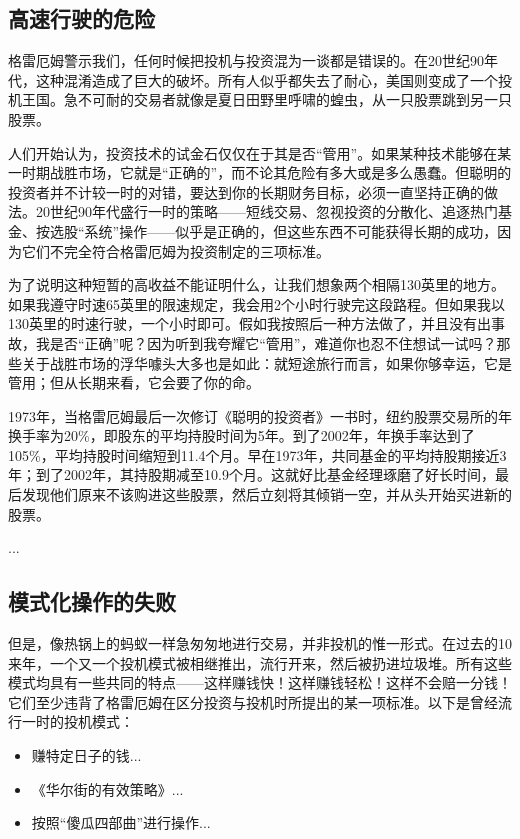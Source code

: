 \documentclass[12pt,oneside]{book}
\begin{document}
\subsection{高速行驶的危险}
格雷厄姆警示我们，任何时候把投机与投资混为一谈都是错误的。在20世纪90年代，这种混淆造成了巨大的破坏。所有人似乎都失去了耐心，美国则变成了一个投机王国。急不可耐的交易者就像是夏日田野里呼啸的蝗虫，从一只股票跳到另一只股票。

人们开始认为，投资技术的试金石仅仅在于其是否“管用”。如果某种技术能够在某一时期战胜市场，它就是“正确的”，而不论其危险有多大或是多么愚蠢。但聪明的投资者并不计较一时的对错，要达到你的长期财务目标，必须一直坚持正确的做法。20世纪90年代盛行一时的策略——短线交易、忽视投资的分散化、追逐热门基金、按选股“系统”操作——似乎是正确的，但这些东西不可能获得长期的成功，因为它们不完全符合格雷厄姆为投资制定的三项标准。

为了说明这种短暂的高收益不能证明什么，让我们想象两个相隔130英里的地方。如果我遵守时速65英里的限速规定，我会用2个小时行驶完这段路程。但如果我以130英里的时速行驶，一个小时即可。假如我按照后一种方法做了，并且没有出事故，我是否“正确”呢？因为听到我夸耀它“管用”，难道你也忍不住想试一试吗？那些关于战胜市场的浮华噱头大多也是如此：就短途旅行而言，如果你够幸运，它是管用；但从长期来看，它会要了你的命。

1973年，当格雷厄姆最后一次修订《聪明的投资者》一书时，纽约股票交易所的年换手率为20\%，即股东的平均持股时间为5年。到了2002年，年换手率达到了105\%，平均持股时间缩短到11.4个月。早在1973年，共同基金的平均持股期接近3年；到了2002年，其持股期减至10.9个月。这就好比基金经理琢磨了好长时间，最后发现他们原来不该购进这些股票，然后立刻将其倾销一空，并从头开始买进新的股票。

...



\subsection{模式化操作的失败}
但是，像热锅上的蚂蚁一样急匆匆地进行交易，并非投机的惟一形式。在过去的10来年，一个又一个投机模式被相继推出，流行开来，然后被扔进垃圾堆。所有这些模式均具有一些共同的特点——这样赚钱快！这样赚钱轻松！这样不会赔一分钱！它们至少违背了格雷厄姆在区分投资与投机时所提出的某一项标准。以下是曾经流行一时的投机模式：

\begin{itemize}
\item 赚特定日子的钱...

\item 《华尔街的有效策略》...

\item 按照“傻瓜四部曲”进行操作...

\end{itemize}
\end{document}
